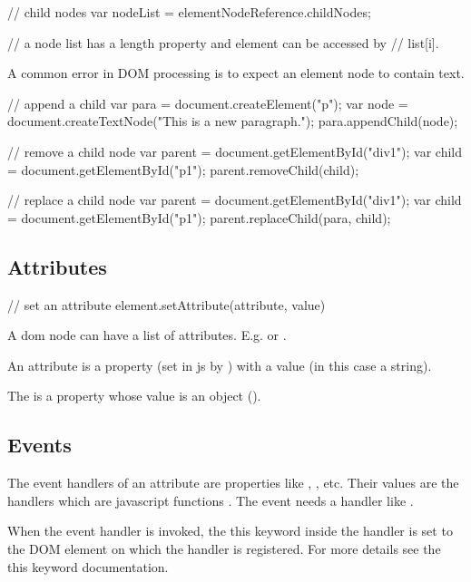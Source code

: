\begin{js}
  // child nodes
  var nodeList = elementNodeReference.childNodes;

  // a node list has a length property and element can be accessed by
  // list[i].
\end{js}

A common error in DOM processing is to expect an element node to contain text.

\begin{js}
  // append a child
  var para = document.createElement("p");
  var node = document.createTextNode("This is a new paragraph.");
  para.appendChild(node);

  // remove a child node
  var parent = document.getElementById("div1");
  var child = document.getElementById("p1");
  parent.removeChild(child);

  // replace a child node
  var parent = document.getElementById("div1");
  var child = document.getElementById("p1");
  parent.replaceChild(para, child);
\end{js}

\subsection{Attributes}


\begin{js}
  // set an attribute
  element.setAttribute(attribute, value)
\end{js}

A dom node can have a list of attributes. E.g.  or .

An attribute is a property (set in js by ) with
a value (in this case a string).

The  is a property whose value is an object
().



\subsection{Events}

The event handlers of an attribute are properties like ,
, etc. Their values are the handlers which are javascript
functions . The event  needs a handler
like . 


When the event handler is invoked, the this keyword inside the handler is set
to the DOM element on which the handler is registered. For more details see
the this keyword documentation.

